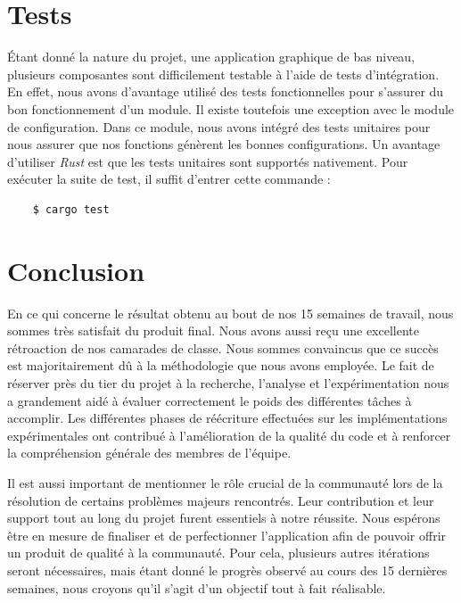 \documentclass[titlepage]{article}
\begin{document}
\section{Tests}
Étant donné la nature du projet, une application graphique de bas niveau, plusieurs composantes sont difficilement testable à l'aide de tests d'intégration. En effet, nous avons d'avantage utilisé des tests fonctionnelles pour s'assurer du bon fonctionnement d'un module. Il existe toutefois une exception avec le module de configuration. Dans ce module, nous avons intégré des tests unitaires pour nous assurer que nos fonctions génèrent les bonnes configurations. Un avantage d'utiliser \textit{Rust} est que les tests unitaires sont supportés nativement. Pour exécuter la suite de test, il suffit d'entrer cette commande :
\begin{verbatim}
	$ cargo test
\end{verbatim}

\section{Conclusion}
\par
En ce qui concerne le résultat obtenu au bout de nos 15 semaines de travail, nous sommes très satisfait du produit final. Nous avons aussi reçu une excellente rétroaction de nos camarades de classe. Nous sommes convaincus que ce succès est majoritairement dû à la méthodologie que nous avons employée. Le fait de réserver près du tier du projet à la recherche, l'analyse et l'expérimentation nous a grandement aidé à évaluer correctement le poids des différentes tâches à accomplir. Les différentes phases de réécriture effectuées sur les implémentations expérimentales ont contribué à l'amélioration de la qualité du code et à renforcer la compréhension générale des membres de l'équipe.
\bigskip

\par
Il est aussi important de mentionner le rôle crucial de la communauté lors de la résolution de certains problèmes majeurs rencontrés. Leur contribution et leur support tout au long du projet furent essentiels à notre réussite. Nous espérons être en mesure de finaliser et de perfectionner l'application afin de pouvoir offrir un produit de qualité à la communauté. Pour cela, plusieurs autres itérations seront nécessaires, mais étant donné le progrès observé au cours des 15 dernières semaines, nous croyons qu'il s'agit d'un objectif tout à fait réalisable.
\bigskip
\end{document}
